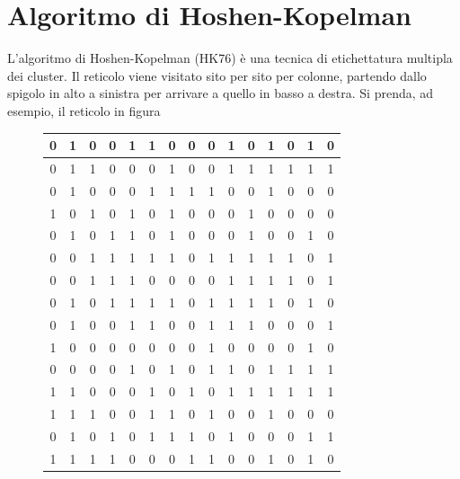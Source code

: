 \section{Algoritmo di Hoshen-Kopelman}
L’algoritmo di Hoshen-Kopelman (HK76) è una tecnica di etichettatura multipla dei cluster. Il reticolo viene visitato sito per sito per colonne, partendo dallo spigolo in alto a sinistra per arrivare a quello in basso a destra. Si prenda, ad esempio, il reticolo
in figura
\begin{figure}[H]
	\centering
	\scriptsize %
	\setlength{\tabcolsep}{5.4pt} %
	\renewcommand{\arraystretch}{1.3} %
	\begin{minipage}{0.45\textwidth}
		\centering
		\begin{tabular}{|*{15}{c|}}
			\hline
			0 & 1 & 0 & 0 & 1 & 1 & 0 & 0 & 0 & 1 & 0 & 1 & 0 & 1 & 0 \\
			\hline
			0 & 1 & 1 & 0 & 0 & 0 & 1 & 0 & 0 & 1 & 1 & 1 & 1 & 1 & 1 \\
			\hline
			0 & 1 & 0 & 0 & 0 & 1 & 1 & 1 & 1 & 0 & 0 & 1 & 0 & 0 & 0 \\
			\hline
			1 & 0 & 1 & 0 & 1 & 0 & 1 & 0 & 0 & 0 & 1 & 0 & 0 & 0 & 0 \\
			\hline
			0 & 1 & 0 & 1 & 1 & 0 & 1 & 0 & 0 & 0 & 1 & 0 & 0 & 1 & 0 \\
			\hline
			0 & 0 & 1 & 1 & 1 & 1 & 1 & 0 & 1 & 1 & 1 & 1 & 1 & 0 & 1 \\
			\hline
			0 & 0 & 1 & 1 & 1 & 0 & 0 & 0 & 0 & 1 & 1 & 1 & 1 & 0 & 1 \\
			\hline
			0 & 1 & 0 & 1 & 1 & 1 & 1 & 0 & 1 & 1 & 1 & 1 & 0 & 1 & 0 \\
			\hline
			0 & 1 & 0 & 0 & 1 & 1 & 0 & 0 & 1 & 1 & 1 & 0 & 0 & 0 & 1 \\
			\hline
			1 & 0 & 0 & 0 & 0 & 0 & 0 & 0 & 1 & 0 & 0 & 0 & 0 & 1 & 0 \\
			\hline
			0 & 0 & 0 & 0 & 1 & 0 & 1 & 0 & 1 & 1 & 0 & 1 & 1 & 1 & 1 \\
			\hline
			1 & 1 & 0 & 0 & 0 & 1 & 0 & 1 & 0 & 1 & 1 & 1 & 1 & 1 & 1 \\
			\hline
			1 & 1 & 1 & 0 & 0 & 1 & 1 & 0 & 1 & 0 & 0 & 1 & 0 & 0 & 0 \\
			\hline
			0 & 1 & 0 & 1 & 0 & 1 & 1 & 1 & 0 & 1 & 0 & 0 & 0 & 1 & 1 \\
			\hline
			1 & 1 & 1 & 1 & 0 & 0 & 0 & 1 & 1 & 0 & 0 & 1 & 0 & 1 & 0 \\
			\hline

\end{tabular}
\end{minipage}
\end{figure}
